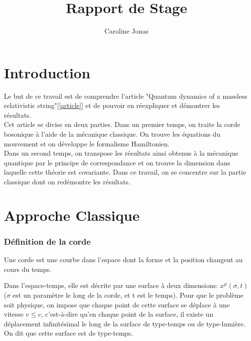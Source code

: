 \documentclass[a4paper,12pt]{article}
\title{Rapport de Stage}
\author{Caroline Jonas}
\begin{document}
\maketitle

\part*{Introduction}
Le but de ce travail est de comprendre l'article "Quantum dynamics of a massless relativistic string"[\ref{article}] et de pouvoir en réexpliquer et démontrer les résultats.\\
Cet article se divise en deux parties. Dans un premier temps, on traite la corde bosonique à l'aide de la mécanique classique. On trouve les équations du mouvement et on développe le formalisme Hamiltonien.\\
Dans un second temps, on transpose les résultats ainsi obtenus à la mécanique quantique par le principe de correspondance et on trouve la dimension dans laquelle cette théorie est covariante.
Dans ce travail, on se concentre sur la partie classique dont on redémontre les résultats.
 
\part*{Approche Classique}
\section{Définition de la corde}
Une corde est une courbe dans l'espace dont la forme et la position changent au cours du temps.

Dans l'espace-temps, elle est décrite par une surface à deux dimensions:
$x^{\mu}(\sigma,t)$ ($\sigma$ est un paramètre le long de la corde, et t est le temps).
Pour que le problème soit physique, on impose que chaque point de cette surface se déplace à une vitesse $v\leq c$, c'est-à-dire qu'en chaque point de la surface, il existe un déplacement infinitésimal le long de la surface de type-temps ou de type-lumière. On dit que cette surface est de type-temps.
\end{document}
